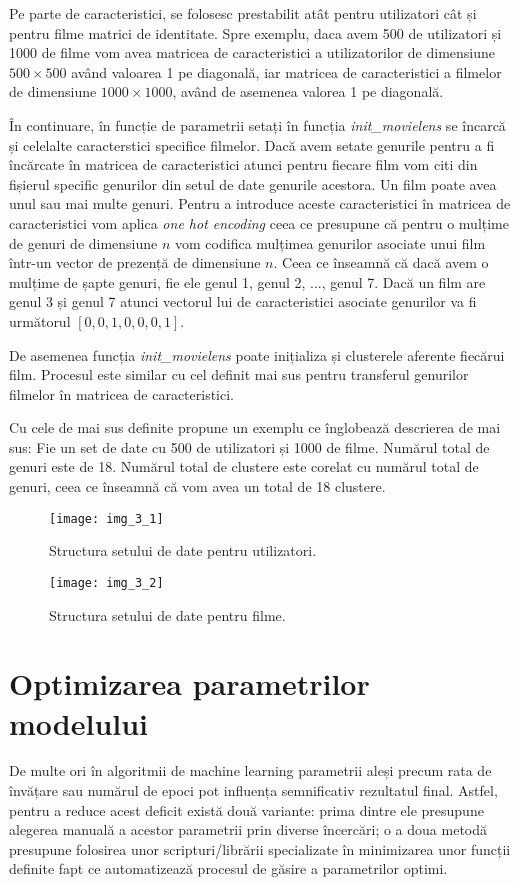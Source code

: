Pe parte de caracteristici, se folosesc prestabilit atât pentru utilizatori cât și pentru filme matrici de identitate. Spre exemplu, daca avem 500 de utilizatori și 1000 de filme vom avea matricea de caracteristici a utilizatorilor de dimensiune $500 \times 500$ având valoarea 1 pe diagonală, iar matricea de caracteristici a filmelor de dimensiune $1000 \times 1000$, având de asemenea valorea 1 pe diagonală.

În continuare, în funcție de parametrii setați în funcția \textit{init\_movielens} se încarcă și celelalte caracterstici specifice filmelor. Dacă avem setate genurile pentru a fi încărcate în matricea de caracteristici atunci pentru fiecare film vom citi din fișierul specific genurilor din setul de date genurile acestora. Un film poate avea unul sau mai multe genuri. Pentru a introduce aceste caracteristici în matricea de caracteristici vom aplica \textit{one hot encoding} ceea ce presupune că pentru o mulțime de genuri de dimensiune $n$ vom codifica mulțimea genurilor asociate unui film într-un vector de prezență de dimensiune $n$. Ceea ce înseamnă că dacă avem o mulțime de șapte genuri, fie ele genul 1, genul 2, ..., genul 7. Dacă un film are genul 3 și genul 7 atunci vectorul lui de caracteristici asociate genurilor va fi următorul $[0, 0, 1, 0, 0, 0, 1]$.

De asemenea funcția \textit{init\_movielens} poate inițializa și clusterele aferente fiecărui film. Procesul este similar cu cel definit mai sus pentru transferul genurilor filmelor în matricea de caracteristici.

Cu cele de mai sus definite propune un exemplu ce înglobează descrierea de mai sus:
Fie un set de date cu 500 de utilizatori și 1000 de filme. Numărul total de genuri este de 18. Numărul total de clustere este corelat cu numărul total de genuri, ceea ce înseamnă că vom avea un total de 18 clustere.
\begin{figure}[!h]
	\centering
	\texttt{[image: img\_3\_1]}
	\caption[Structura setului de date pentru utilizatori]{Structura setului de date pentru utilizatori.}
\end{figure} 

\begin{figure}[!h]
	\centering
	\texttt{[image: img\_3\_2]}
	\caption[Structura setului de date pentru filme]{Structura setului de date pentru filme.}
\end{figure} 

\section{Optimizarea parametrilor modelului}
De multe ori în algoritmii de machine learning parametrii aleși precum rata de învățare sau numărul de epoci pot influența semnificativ rezultatul final. Astfel, pentru a reduce acest deficit există două variante: prima dintre ele presupune alegerea manuală a acestor parametrii prin diverse încercări; o a doua metodă presupune folosirea unor scripturi/librării specializate în minimizarea unor funcții definite fapt ce automatizează procesul de găsire a parametrilor optimi.

